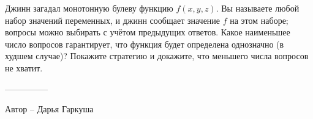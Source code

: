 \question
Джинн загадал монотонную булеву функцию $f(x,y,z)$. Вы называете любой набор значений переменных, и джинн сообщает значение $f$ на этом наборе; вопросы можно выбирать с учётом предыдущих ответов. Какое наименьшее число вопросов гарантирует, что функция будет определена однозначно (в худшем случае)? Покажите стратегию и докажите, что меньшего числа вопросов не хватит.

---------------

Автор -- Дарья Гаркуша